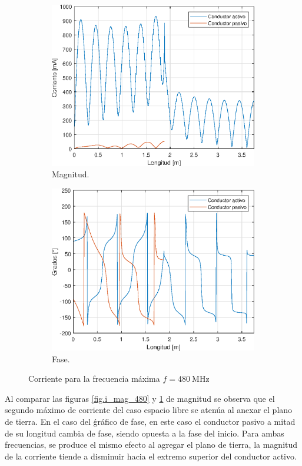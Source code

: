 \begin{figure}[H]
\begin{subfigure}{0.5\textwidth}
		\includegraphics[scale=0.6]{imagenes/i_mag_480_tierra.eps}
		\caption{Magnitud.}
		\label{fig.i_mag_480_tierra}
	\end{subfigure}
	\quad
	\begin{subfigure}{0.5\textwidth}
		\includegraphics[scale=0.6]{imagenes/i_fase_480_tierra.eps}
		\caption{Fase.}
		\label{fig.i_fase_480_tierra}
	\end{subfigure}
	\caption{Corriente para la frecuencia máxima $f = \SI{480}{\mega\hertz}$}
\end{figure}

Al comparar las figuras \ref{fig.i_mag_480} y \ref{fig.i_mag_480_tierra} de magnitud se observa que el segundo máximo de corriente del caso espacio libre se atenúa al anexar el plano de tierra. En el caso del ǵráfico de fase, en este caso el conductor pasivo a mitad de su longitud cambia de fase, siendo opuesta a la fase del inicio.
Para ambas frecuencias, se produce el mismo efecto al agregar el plano de tierra, la magnitud de la corriente tiende a disminuir hacia el extremo superior del conductor activo.
